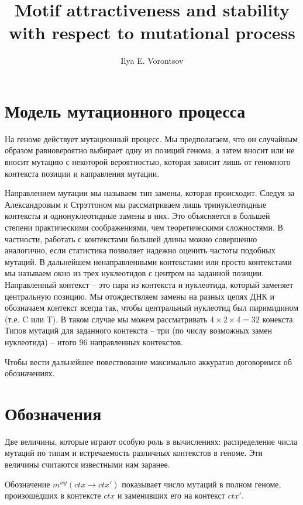 \documentclass[a4paper]{article}
\newcommand\wg{{}^{wg}}
\newcommand\dirctx{ctx\to ctx'}
\begin{document}
\title{Motif attractiveness and stability with respect to mutational process}
\author{Ilya E. Vorontsov}
\maketitle

\section*{Модель мутационного процесса}
На геноме действует мутационный процесс. Мы предполагаем, что он случайным образом равновероятно выбирает одну из позиций генома, а затем вносит или не вносит мутацию с некоторой вероятностью, которая зависит лишь от геномного контекста позиции и направления мутации.

Направлением мутации мы называем тип замены, которая происходит. Следуя за Александровым и Стрэттоном мы рассматриваем лишь тринуклеотидные контексты и однонуклеотидные замены в них. Это объясняется в большей степени практическими соображениями, чем теоретическими сложностями. В частности, работать с контекстами большей длины можно совершенно аналогично, если статистика позволяет надежно оценить частоты подобных мутаций. В дальнейшем ненаправленными контекстами или просто контекстами мы называем окно из трех нуклеотидов с центром на заданной позиции. Направленный контекст -- это пара из контекста и нуклеотида, который заменяет центральную позицию. Мы отождествляем замены на разных цепях ДНК и обозначаем контекст всегда так, чтобы центральный нуклеотид был пиримидином (т.е. C или T). В таком случае мы можем рассматривать $4\times 2\times 4=32$ конекста. Типов мутаций для заданного контекста -- три (по числу возможных замен нуклеотида) -- итого 96 направленных контекстов.

Чтобы вести дальнейшее повествование максимально аккуратно договоримся об обозначениях.


\section*{Обозначения}
Две величины, которые играют особую роль в вычислениях: распределение числа мутаций по типам и встречаемость различных контекстов в геноме. Эти величины считаются известными нам заранее.

Обозначение $m\wg(\dirctx)$ показывает число мутаций в полном геноме, произошедших в контексте $ctx$ и заменивших его на контекст $ctx'$.
\end{document}

